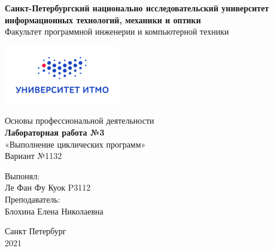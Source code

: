 \begin{center}
\textbf{\large{Санкт-Петербургский национально исследовательский университет}}\\
\textbf{\large{информационных технологий, механики и оптики}}\\
\large{Факультет программной инженерии и компьютерной техники}\\
\end{center}
\begin{center}
\includegraphics{img/Itmologo.png}
\end{center}
\begin{center}
\vspace{5cm}
\large{Основы профессиональной деятельности} \\
\textbf{\large{Лабораторная работа №3}}\\
\large{«Выполнение циклических программ»\\
Вариант №1132}\\
\end{center}
\vspace{5cm}
\begin{flushright}
Выпонял: \\
Ле Фан Фу Куок P3112 \\
Преподаватель: \\
Блохина Елена Николаевна \\
\end{flushright}
\thispagestyle{empty}
\vfill
\begin{center} 
Санкт Петербург\\
2021
\end{center}
